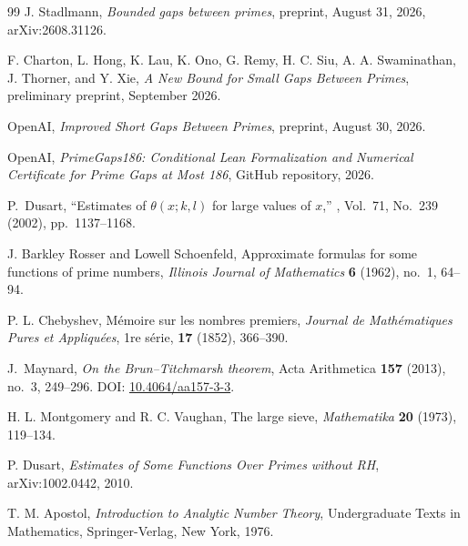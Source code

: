 \documentclass[11pt,a4paper]{article}
\theoremstyle{definition}
\theoremstyle{remark}
\begin{document}
\begin{thebibliography}{99}
J. Stadlmann,
\textit{Bounded gaps between primes},
preprint, August 31, 2026,
arXiv:2608.31126.

F. Charton, L. Hong, K. Lau, K. Ono, G. Remy, H. C. Siu,
A. A. Swaminathan, J. Thorner, and Y. Xie,
\textit{A New Bound for Small Gaps Between Primes},
preliminary preprint, September 2026.

OpenAI,
\textit{Improved Short Gaps Between Primes},
preprint, August 30, 2026.

OpenAI,
\textit{PrimeGaps186: Conditional Lean Formalization and Numerical
Certificate for Prime Gaps at Most 186},
GitHub repository, 2026.


P.~Dusart,
\newblock ``Estimates of $\theta(x; k, l)$ for large values of $x$,''
, Vol.~71, No.~239 (2002), pp.~1137--1168.

J. Barkley Rosser and Lowell Schoenfeld,
Approximate formulas for some functions of prime numbers,
\textit{Illinois Journal of Mathematics} \textbf{6} (1962), no.~1,
64--94.

P. L. Chebyshev,
Mémoire sur les nombres premiers,
\textit{Journal de Mathématiques Pures et Appliquées},
1re série, \textbf{17} (1852), 366--390.

J.~Maynard,
\emph{On the Brun--Titchmarsh theorem},
Acta Arithmetica \textbf{157} (2013), no.~3, 249--296.
DOI: \href{https://doi.org/10.4064/aa157-3-3}{10.4064/aa157-3-3}.

H. L. Montgomery and R. C. Vaughan,
The large sieve,
\textit{Mathematika} \textbf{20} (1973), 119--134.

P. Dusart,
\textit{Estimates of Some Functions Over Primes without RH},
arXiv:1002.0442, 2010.

T. M. Apostol,
\textit{Introduction to Analytic Number Theory},
Undergraduate Texts in Mathematics,
Springer-Verlag, New York, 1976.

\end{thebibliography}
\end{document}
